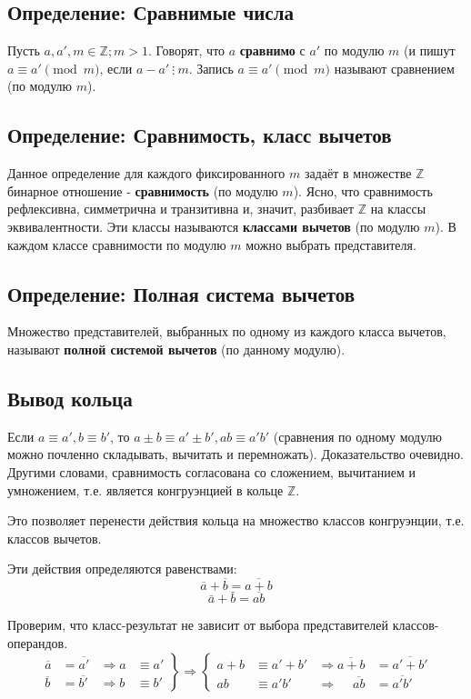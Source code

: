 \documentclass{article}
\newcommand{\divs}{~\vdots~}
\begin{document}
\subsection{Определение: Сравнимые числа}
Пусть $a, a', m \in \mathbb Z; m > 1$. Говорят, что $a$ \textbf{сравнимо} с $a'$ по модулю $m$ (и пишут $a \equiv a' \pmod{m}$, если $a - a' \divs m$. Запись $a \equiv a' \pmod{m}$ называют сравнением (по модулю $m$).

\subsection{Определение: Сравнимость, класс вычетов}
Данное определение для каждого фиксированного $m$ задаёт в множестве $\mathbb Z$ бинарное отношение - \textbf{сравнимость} (по модулю $m$). Ясно, что сравнимость рефлексивна, симметрична и транзитивна и, значит, разбивает $\mathbb Z$ на классы эквивалентности. Эти классы называются \textbf{классами вычетов} (по модулю $m$). В каждом классе сравнимости по модулю $m$ можно выбрать представителя.

\subsection{Определение: Полная система вычетов}
Множество представителей, выбранных по одному из каждого класса вычетов, называют \textbf{полной системой вычетов} (по данному модулю).

\subsection{Вывод кольца}
Если $a \equiv a', b \equiv b'$, то $a \pm b \equiv a' \pm b', ab \equiv a'b'$ (сравнения по одному модулю можно почленно складывать, вычитать и перемножать). Доказательство очевидно. Другими словами, сравнимость согласована со сложением, вычитанием и умножением, т.е. является конгруэнцией в кольце $\mathbb Z$.

Это позволяет перенести действия кольца на множество классов конгруэнции, т.е. классов вычетов.

Эти действия определяются равенствами:
\[\overline a + \overline b = \overline{a + b}\]
\[\bar a + \bar b = \overline{ab}\]


Проверим, что класс-результат не зависит от выбора представителей классов-операндов.
\[
\left.
\begin{aligned}
\overline a &= \overline{a'} &\Rightarrow a &\equiv a' \\
\overline b &= \overline{b'} &\Rightarrow b &\equiv b'
\end{aligned}
\right\} \Rightarrow \left\{
\begin{aligned}
a + b &\equiv a' + b'   &\Rightarrow   \overline{a + b} &= \overline{a' + b'} \\
ab &\equiv a'b'   &\Rightarrow ~\quad \overline{ab} &= \overline{a'b'}
\end{aligned}
\right.
\]
\end{document}
